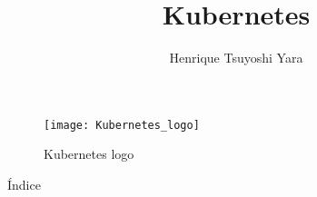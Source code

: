 \documentclass{beamer}
\title {Kubernetes}
\author {Henrique Tsuyoshi Yara}
\institute {OPUS-software}
\begin{document}
\begin{frame}{\titlepage}
	\begin{figure}[htpb]
		\centering
		\texttt{[image: Kubernetes\_logo]}
		\caption{Kubernetes logo}
	\end{figure}
\end{frame}

\begin{frame}{Índice}
\begin{multicols}{2}
  \tableofcontents
\end{multicols}
\end{frame}











\end{document}

